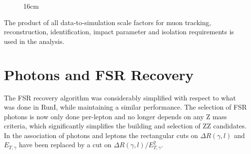 \begin{figure}[hbtp]{16cm}
	\label{fig:muon_tracking_efficiency}
\end{figure}

The product of all data-to-simulation scale factors for muon tracking, reconstruction, identification, impact parameter and isolation requirements is used in the analysis.

\section{Photons and FSR Recovery}
The FSR recovery algorithm was considerably simplified with respect to what was done in RunI, while maintaining a similar performance. The selection of FSR photons is now only done per-lepton and no longer depends on any Z mass criteria, which significantly simplifies the building and selection of ZZ candidates. In the association of photons and leptons the rectangular cuts on $\Delta R(\gamma,l)$ and $E_{T,\gamma}$ have been replaced by a cut on $\Delta R(\gamma,l)/E_{T,\gamma}^{2}$.

